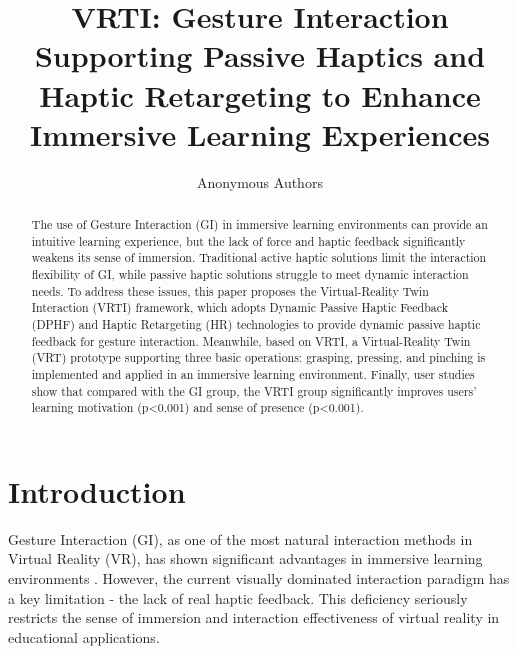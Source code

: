 \documentclass[runningheads]{llncs}
\begin{document}
\title{VRTI: Gesture Interaction Supporting Passive Haptics and Haptic Retargeting to Enhance Immersive Learning Experiences}
\author{Anonymous Authors}

\maketitle

\begin{abstract}
The use of Gesture Interaction (GI) in immersive learning environments can provide an intuitive learning experience, but the lack of force and haptic feedback significantly weakens its sense of immersion. Traditional active haptic solutions limit the interaction flexibility of GI, while passive haptic solutions struggle to meet dynamic interaction needs. To address these issues, this paper proposes the Virtual-Reality Twin Interaction (VRTI) framework, which adopts Dynamic Passive Haptic Feedback (DPHF) and Haptic Retargeting (HR) technologies to provide dynamic passive haptic feedback for gesture interaction. Meanwhile, based on VRTI, a Virtual-Reality Twin (VRT) prototype supporting three basic operations: grasping, pressing, and pinching is implemented and applied in an immersive learning environment. Finally, user studies show that compared with the GI group, the VRTI group significantly improves users' learning motivation (p<0.001) and sense of presence (p<0.001).

\end{abstract}

\section{Introduction}
Gesture Interaction (GI), as one of the most natural interaction methods in Virtual Reality (VR), has shown significant advantages in immersive learning environments \cite{fang2024interactive,amaral2024interactive}. However, the current visually dominated interaction paradigm has a key limitation - the lack of real haptic feedback. This deficiency seriously restricts the sense of immersion and interaction effectiveness of virtual reality in educational applications.
\end{document}
